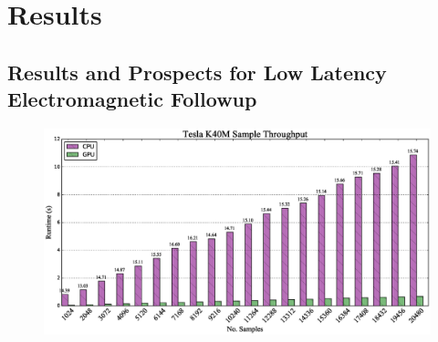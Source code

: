 \chapter{Results}

\section{Results and Prospects for Low Latency Electromagnetic Followup}
\begin{figure}[H!]
\hspace{-5.0cm}
\includegraphics[scale=0.57]{speedup.eps}
\end{figure}

